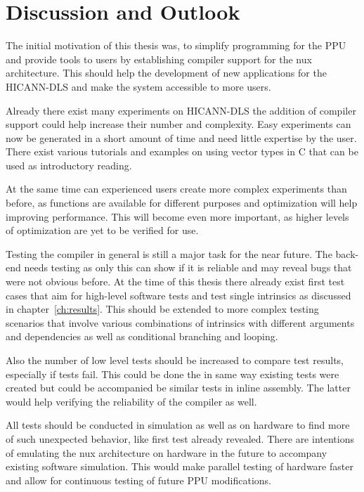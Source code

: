 \chapter{Discussion and Outlook}
\label{chapter:discussion}

The initial motivation of this thesis was, to simplify programming for the \ac{PPU} and provide tools to users by establishing compiler support for the nux architecture.
This should help the development of new applications for the \ac{HICANN-DLS} and make the system accessible to more users.

Already there exist many experiments on \ac{HICANN-DLS} the addition of compiler support could help increase their number and complexity.
Easy experiments can now be generated in a short amount of time and need little expertise by the user.
There exist various tutorials and examples on using vector types in C  that can be used as introductory reading.

At the same time can experienced users create more complex experiments than before, as functions are available for different purposes and optimization will help improving performance.
This will become even more important, as higher levels of optimization are yet to be verified for use.

Testing the compiler in general is still a major task for the near future.
The back-end needs testing as only this can show if it is reliable and may reveal bugs that were not obvious before.
At the time of this thesis there already exist first test cases that aim for high-level software tests and test single intrinsics as discussed in chapter~\ref{ch:results}.
This should be extended to more complex testing scenarios that involve various combinations of intrinsics with different arguments and dependencies as well as conditional branching and looping.

Also the number of low level tests should be increased to compare test results, especially if tests fail.
This could be done the in same way existing tests were created but could be accompanied be similar tests in inline assembly.
The latter would help verifying the reliability of the compiler as well.

All tests should be conducted in simulation as well as on hardware to find more of such unexpected behavior, like first test already revealed.
There are intentions of emulating the nux architecture on hardware in the future to accompany existing software simulation.
This would make parallel testing of hardware faster and allow for continuous testing of future \ac{PPU} modifications.

